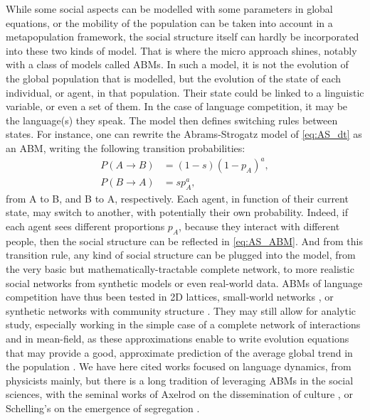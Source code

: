 \documentclass[../thesis.tex]{subfiles}
\begin{document}
While some social aspects can be modelled with some parameters in global equations, or
the mobility of the population can be taken into account in a metapopulation framework,
the social structure itself can hardly be incorporated into these two kinds of model.
That is where the micro approach shines, notably with a class of models called
\acp{ABM}. In such a model, it is not the evolution of the global population that is
modelled, but the evolution of the state of each individual, or agent, in that
population. Their state could be linked to a linguistic variable, or even a set of them.
In the case of language competition, it may be the language(s) they speak. The model
then defines switching rules between states. For instance, one can rewrite the
Abrams-Strogatz model of \eqref{eq:AS_dt} as an \ac{ABM}, writing the following
transition probabilities:
\begin{equation}
  \label{eq:AS_ABM}
  \begin{aligned}
    P(A \rightarrow B) &= (1 - s) (1 - p_A)^a, \\
    P(B \rightarrow A) &= s p_A^a,
  \end{aligned}
\end{equation}
from A to B, and B to A, respectively. Each agent, in function of their current state,
may switch to another, with potentially their own probability. Indeed, if each agent
sees different proportions $p_A$, because they interact with different people, then the
social structure can be reflected in \eqref{eq:AS_ABM}. And from this transition rule,
any kind of social structure can be plugged into the model, from the very basic but
mathematically-tractable complete network, to more realistic social networks from
synthetic models or even real-world data. \Acp{ABM} of language competition have thus
been tested in 2D lattices, small-world networks \cite{WattsCollectiveDynamics1998}, or
synthetic networks with community structure
\cite{CastelloOrderingDynamics2006,MinettModellingEndangered2008,CaridiSchellingvoterModel2013,CastelloAgentbasedModels2013,VazquezAgentBased2010}. They may still allow for analytic study, especially working in the simple case of a complete network of interactions and in mean-field, as these approximations enable to write evolution equations that may provide a good, approximate prediction of the average global trend in the population \cite{VazquezAgentBased2010}. We have here cited works focused on language dynamics, from physicists mainly, but there is a long tradition of leveraging \acp{ABM} in the social sciences, with the seminal works of Axelrod on the dissemination of culture \cite{AxelrodDisseminationCulture1997}, or Schelling's on the emergence of segregation \cite{SchellingDynamicModels1971}.
\end{document}
